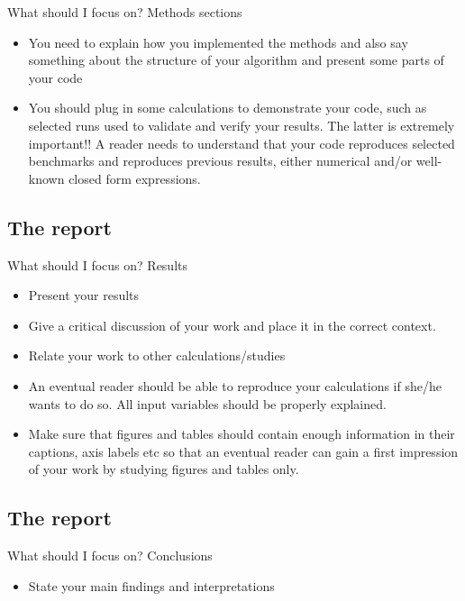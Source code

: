 \documentclass[%
oneside,                 %
final,                   %
10pt]{article}
\begin{document}
{{{{{{{{{\begin{block}{What should I focus on? Methods sections }
\begin{itemize}
 \item You need to explain how you implemented the methods and also say something about the structure of your algorithm and present some parts of your code

 \item You should plug in some calculations to demonstrate your code, such as selected runs used to validate and verify your results. The latter is extremely important!!  A reader needs to understand that your code reproduces selected benchmarks and reproduces previous results, either numerical and/or well-known  closed form expressions.
\end{itemize}

\noindent
\end{block}


\subsection{The report}
\begin{block}{What should I focus on? Results }
\begin{itemize}
 \item Present your results

 \item Give a critical discussion of your work and place it in the correct context.

 \item Relate your work to other calculations/studies

 \item An eventual reader should be able to reproduce your calculations if she/he wants to do so. All input variables should be properly explained.

 \item Make sure that figures and tables should contain enough information in their captions, axis labels etc so that an eventual reader can gain a first impression of your work by studying figures and tables only.
\end{itemize}

\noindent
\end{block}


\subsection{The report}
\begin{block}{What should I focus on? Conclusions }
\begin{itemize}
 \item State your main findings and interpretations


\end{itemize}
\end{block}}}}}}}}}}
\end{document}
